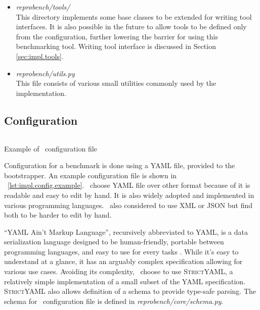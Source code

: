 \begin{itemize}
    \item \emph{reprobench/tools/}\\
    This directory implements some base classes to be extended for writing tool interfaces.
    It is also possible in the future to allow tools to be defined only from the configuration, further lowering the barrier for using this benchmarking tool.
    Writing tool interface is discussed in Section \ref{sec:impl.tools}.

    \item \emph{reprobench/utils.py}\\
    This file consists of various small utilities commonly used by the implementation.


\end{itemize}


\subsection{Configuration}

\begin{listing}
    \inputminted{yaml}{assets/listings/reprobench/examples/sat/benchmark.yml}
    \caption{Example of \OurBenchmarkingTool~configuration file}
    \label{lst:impl.config.example}
\end{listing}

Configuration for a benchmark is done using a YAML file, provided to the bootstrapper.
An example configuration file is shown in \lst~\ref{lst:impl.config.example}.
\First~choose YAML file over other format because of it is readable and easy to edit by hand.
It is also widely adopted and implemented in various programming languages.
\First~also considered to use XML or JSON but find both to be harder to edit by hand.

``YAML Ain’t Markup Language'', recursively abbreviated to YAML, is a data serialization language designed to be human-friendly, portable between programming languages, and easy to use for every tasks \citep{ben2005yaml}.
While it's easy to understand at a glance, it has an arguably complex specification allowing for various use cases.
Avoiding its complexity, \first~choose to use \textsc{StrictYAML}, a relatively simple implementation of a small subset of the YAML specification.
\textsc{StrictYAML} also allows definition of a schema to provide type-safe parsing.
The schema for \OurBenchmarkingTool~configuration file is defined in \emph{reprobench/core/schema.py}.


